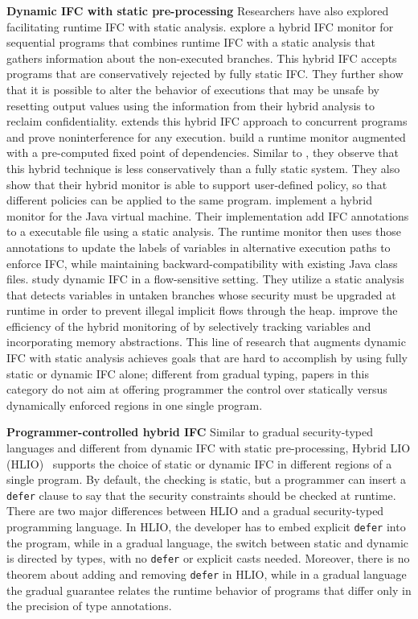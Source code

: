 \textbf{Dynamic IFC with static pre-processing} Researchers have also explored
facilitating runtime IFC with static analysis. \textcite{le2005monitoring}
explore a hybrid IFC monitor for sequential programs that combines runtime IFC
with a static analysis that gathers information about the non-executed branches.
This hybrid IFC accepts programs that are conservatively rejected by fully
static IFC. They further show that it is possible to alter the behavior of
executions that may be unsafe by resetting output values using the information
from their hybrid analysis to reclaim confidentiality.
\textcite{le2007automaton} extends this hybrid IFC approach to concurrent
programs and prove noninterference for any execution. \textcite{Shroff:2007tg}
build a runtime monitor augmented with a pre-computed fixed point of
dependencies. Similar to \textcite{le2005monitoring}, they observe that this
hybrid technique is less conservatively than a fully static system. They also
show that their hybrid monitor is able to support user-defined policy, so that
different policies can be applied to the same program. \textcite{Chandra:2007we}
implement a hybrid monitor for the Java virtual machine. Their implementation
add IFC annotations to a executable file using a static analysis. The runtime
monitor then uses those annotations to update the labels of variables in
alternative execution paths to enforce IFC, while maintaining
backward-compatibility with existing Java class files.
\textcite{russo2010dynamic} study dynamic IFC in a flow-sensitive setting. They
utilize a static analysis that detects variables in untaken branches whose
security must be upgraded at runtime in order to prevent illegal implicit flows
through the heap. \textcite{moore2011static} improve the efficiency of the
hybrid monitoring of \textcite{russo2010dynamic} by selectively tracking
variables and incorporating memory abstractions. This line of research that
augments dynamic IFC with static analysis achieves goals that are hard to
accomplish by using fully static or dynamic IFC alone; different from gradual
typing, papers in this category do not aim at offering programmer the control
over statically versus dynamically enforced regions in one single program.

\textbf{Programmer-controlled hybrid IFC} Similar to gradual security-typed
languages and different from dynamic IFC with static pre-processing, Hybrid LIO
(HLIO)~\cite{Buiras:2015aa} supports the choice of static or dynamic IFC in
different regions of a single program. By default, the checking is static, but a
programmer can insert a \texttt{defer} clause to say that the security
constraints should be checked at runtime. There are two major differences
between HLIO and a gradual security-typed programming language. In HLIO, the
developer has to embed explicit \texttt{defer} into the program, while in a
gradual language, the switch between static and dynamic is directed by types,
with no \texttt{defer} or explicit casts needed. Moreover, there is no theorem
about adding and removing \texttt{defer} in HLIO, while in a gradual language
the gradual guarantee relates the runtime behavior of programs that differ only
in the precision of type annotations.

